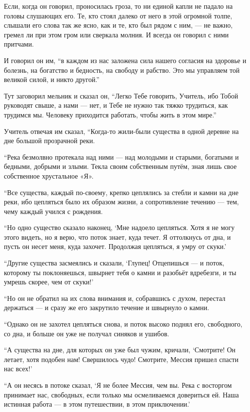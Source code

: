 Если, когда он говорил, проносилась гроза, то ни единой капли не падало на головы слушающих его. Те, кто стоял далеко от него в этой огромной толпе, слышали его слова так же ясно, как и те, кто был рядом с ним, --- не важно, гремел ли при этом гром или сверкала молния. И всегда он говорил с ними притчами.

И говорил он им, ``в каждом из нас заложена сила нашего согласия на здоровье и болезнь, на богатство и бедность, на свободу и рабство. Это мы управляем той великой силой, и никто другой.''

Тут заговорил мельник и сказал он, ``Легко Тебе говорить, Учитель, ибо Тобой руководят свыше, а нами --- нет, и Тебе не нужно так тяжко трудиться, как трудимся мы. Человеку приходится работать, чтобы жить в этом мире.''

Учитель отвечая им сказал, ``Когда-то жили-были существа в одной деревне на дне большой прозрачной реки.

``Река безмолвно протекала над ними --- над молодыми и старыми, богатыми и бедными, добрыми и злыми. Текла своим собственным путём, зная лишь свое собственное хрустальное «Я».

``Все существа, каждый по-своему, крепко цеплялись за стебли и камни на дне реки, ибо цепляться было их образом жизни, а сопротивление течению --- тем, чему каждый учился с рождения.

``Но одно существо сказало наконец, `Мне надоело цепляться. Хотя я не могу этого видеть, но я верю, что поток знает, куда течет. Я оттолкнусь от дна, и пусть он несет меня, куда захочет. Продолжая цепляться, я умру от скуки.'

``Другие существа засмеялись и сказали, `Глупец! Отцепишься --- и поток, которому ты поклоняешься,
 швырнет тебя о камни и разобьёт вдребезги, и ты умрешь скорее, чем от скуки!'

``Но он не обратил на их слова внимания и, собравшись с духом, перестал держаться --- и сразу же его закрутило течение и швырнуло о камни.

``Однако он не захотел цепляться снова, и поток высоко поднял его, свободного, со дна, и больше он уже не получал синяков и ушибов.

``А существа на дне, для которых он уже был чужим, кричали, `Смотрите! Он летает, хотя подобен нам! Свершилось чудо! Смотрите, Мессия пришел спасти нас всех!'

``А он несясь в потоке сказал, `Я не более Мессия, чем вы. Река с восторгом принимает нас, свободных, если только мы осмеливаемся довериться ей. Наша истинная работа --- в этом путешествии, в этом приключении.'

